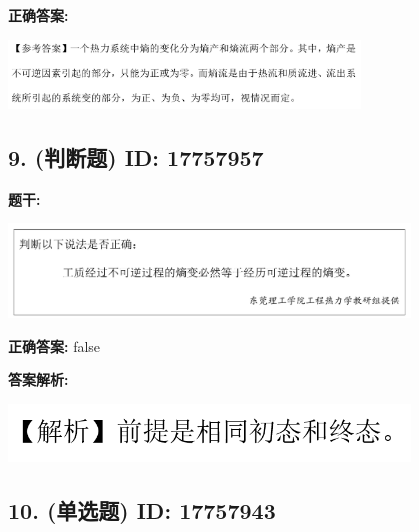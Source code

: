 \documentclass[12pt]{article}
\begin{document}
\textbf{正确答案:}

\begin{center}\includegraphics[width=0.7\textwidth, height=0.2\textheight, keepaspectratio]{question_8_17757965/correct_answer_1_img_1.png}\end{center}

\vspace{0.5em}\hrulefill\vspace{1em}

\subsection*{9. (判断题) \small ID: 17757957}

\textbf{题干:}


\begin{center}\includegraphics[width=0.8\textwidth, height=0.25\textheight, keepaspectratio]{question_9_17757957/title_img_1.png}\end{center}

\textbf{正确答案:}
false

\textbf{答案解析:}


\begin{center}\includegraphics[width=0.8\textwidth, height=0.25\textheight, keepaspectratio]{question_9_17757957/correct_replay_img_1.png}\end{center}

\vspace{0.5em}\hrulefill\vspace{1em}

\subsection*{10. (单选题) \small ID: 17757943}
\end{document}
